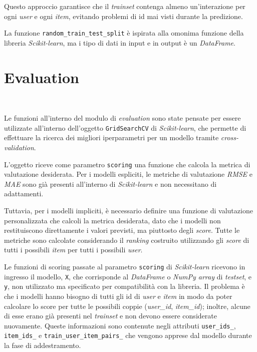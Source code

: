 Questo approccio garantisce che il \textit{trainset} contenga almeno un'interazione per ogni \textit{user} e ogni \textit{item}, evitando problemi di id mai visti durante la predizione.

La funzione \texttt{random\_train\_test\_split} è ispirata alla omonima funzione della libreria \textit{Scikit-learn}, ma i tipo di dati in input e in output è un \textit{DataFrame}.

\section{Evaluation}~\label{evaluation_implementation}

Le funzioni all'interno del modulo di \textit{evaluation} sono state pensate per essere utilizzate all'interno dell'oggetto \texttt{GridSearchCV} di \textit{Scikit-learn}, che permette di effettuare la ricerca dei migliori iperparametri per un modello tramite \textit{cross-validation}.

L'oggetto riceve come parametro \texttt{scoring} una funzione che calcola la metrica di valutazione desiderata. Per i modelli espliciti, le metriche di valutazione \textit{RMSE} e \textit{MAE} sono già presenti all'interno di \textit{Scikit-learn} e non necessitano di adattamenti. 

Tuttavia, per i modelli impliciti, è necessario definire una funzione di valutazione personalizzata che calcoli la metrica desiderata, dato che i modelli non restituiscono direttamente i valori previsti, ma piuttosto degli \textit{score}. Tutte le metriche sono calcolate considerando il \textit{ranking} costruito utilizzando gli \textit{score} di tutti i possibili \textit{item} per tutti i possibili \textit{user}.

Le funzioni di scoring passate al parametro \texttt{scoring} di \textit{Scikit-learn} ricevono in ingresso il modello, \texttt{X}, che corrisponde al \textit{DataFrame} o \textit{NumPy array} di \textit{testset}, e \texttt{y}, non utilizzato ma specificato per compatibilità con la libreria. Il problema è che i modelli hanno bisogno di tutti gli id di \textit{user} e \textit{item} in modo da poter calcolare lo score per tutte le possibili coppie (\textit{user\_id}, \textit{item\_id}); inoltre, alcune di esse erano già presenti nel \textit{trainset} e non devono essere considerate nuovamente. Queste informazioni sono contenute negli attributi \texttt{user\_ids\_}, \texttt{item\_ids\_} e \texttt{train\_user\_item\_pairs\_} che vengono apprese dal modello durante la fase di addestramento.


